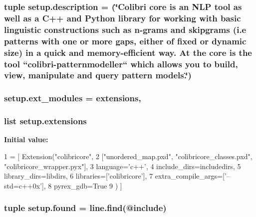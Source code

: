 \subsubsection[{description}]{\setlength{\rightskip}{0pt plus 5cm}tuple setup.\+description = (\char`\"{}Colibri core is an N\+L\+P tool as well as a C++ and Python library for working with basic linguistic constructions such as n-\/grams and skipgrams (i.\+e patterns with one or more gaps, either of fixed or dynamic size) in a quick and memory-\/efficient way. At the core is the tool ``colibri-\/patternmodeller`` which allows you to build, view, manipulate and query pattern models.\char`\"{})}\label{namespacesetup_aa4fb878ed283f922b9ad84355a3b7dbf}
\hypertarget{namespacesetup_a1bf56ea61d1e9865f316116dca2fbfea}{}
\subsubsection[{ext\+\_\+modules}]{\setlength{\rightskip}{0pt plus 5cm}setup.\+ext\+\_\+modules = {\bf extensions},}\label{namespacesetup_a1bf56ea61d1e9865f316116dca2fbfea}
\hypertarget{namespacesetup_ab6b72d56ff85e52faea3f1487c6904f8}{}
\subsubsection[{extensions}]{\setlength{\rightskip}{0pt plus 5cm}list setup.\+extensions}\label{namespacesetup_ab6b72d56ff85e52faea3f1487c6904f8}
{\bfseries Initial value\+:}
\begin{DoxyCode}
1 = [ Extension(\textcolor{stringliteral}{"colibricore"},
2                 [\textcolor{stringliteral}{"unordered\_map.pxd"}, \textcolor{stringliteral}{"colibricore\_classes.pxd"}, \textcolor{stringliteral}{"colibricore\_wrapper.pyx"}],
3                 language=\textcolor{stringliteral}{'c++'},
4                 include\_dirs=includedirs,
5                 library\_dirs=libdirs,
6                 libraries=[\textcolor{stringliteral}{'colibricore'}],
7                 extra\_compile\_args=[\textcolor{stringliteral}{'--std=c++0x'}],
8                 pyrex\_gdb=\textcolor{keyword}{True}
9                 ) ]
\end{DoxyCode}
\hypertarget{namespacesetup_ae70690c3c654eccddc040793c94421fe}{}
\subsubsection[{found}]{\setlength{\rightskip}{0pt plus 5cm}tuple setup.\+found = line.\+find(\textquotesingle{}@include\textquotesingle{})}\label{namespacesetup_ae70690c3c654eccddc040793c94421fe}
\hypertarget{namespacesetup_a5fe113a6f371a2919041a1bf9b992b22}{}
